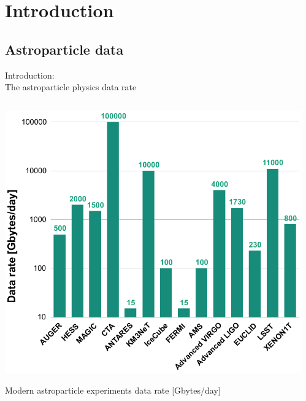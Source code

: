 
\begin{frame}
\titlepage
\end{frame}

\section{Introduction}

\subsection{Astroparticle data}

\begin{frame}{Introduction: \\The astroparticle physics data rate}
\small
\vspace{-2em}
\begin{columns}
  \begin{column}[t]{0.45\textwidth}
    \begin{center}
      \includegraphics[width=1\textwidth]{pics/appec_base4.pdf}
    \end{center}
    \vspace{-2\parsep}
    \small Modern astroparticle experiments data rate [Gbytes/day]\footnotemark[1] %
  \end{column}
  \hfill
  \begin{column}[t]{0.53\textwidth}

\end{column}
\end{columns}
\end{frame}
